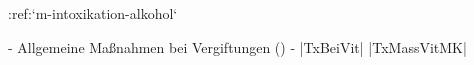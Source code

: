 :ref:`m-intoxikation-alkohol`
\begin{itemize}
    -   Allgemeine Maßnahmen bei Vergiftungen
    ()
    -   |TxBeiVit| |TxMassVitMK|
\end{itemize}